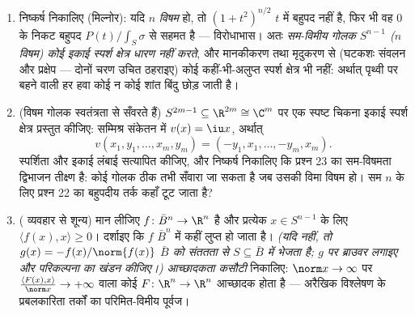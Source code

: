 \begin{problem}[{सप्ताहांत समस्या --- कोई प्रत्याकर्षण नहीं, कोई
पलायन नहीं}]
\begin{enumerate}[resume]
        \[
        P(t) = \pm(1 + t^2)^{n/2}\int_S\sigma,
        \qquad\text{चिह्न } + \text{ के साथ, छोटे } t \text{ के लिए}
        \]
        ( $t = 0$ से  द्वारा सुरक्षित)।
  \item निष्कर्ष निकालिए (मिल्नोर): यदि $n$ \emph{विषम} हो, तो
        $(1 +
        t^2)^{n/2}$ $t$ में बहुपद नहीं है, फिर भी वह $0$ के निकट
        बहुपद $P(t)/\int_S\sigma$ से सहमत है --- विरोधाभास। अतः \emph{सम-विमीय
        गोलक $S^{n-1}$ ($n$ विषम) कोई इकाई स्पर्श क्षेत्र धारण नहीं
        करते}, और मानकीकरण तथा मृदुकरण से (घटकशः संवलन और प्रक्षेप
        --- दोनों चरण उचित ठहराइए) कोई  कहीं-भी-अलुप्त स्पर्श
        क्षेत्र भी नहीं: अर्थात् पृथ्वी पर बहने वाली हर हवा कोई न
        कोई शांत बिंदु छोड़ जाती है।

  \item (विषम गोलक स्वतंत्रता से सँवरते हैं) $S^{2m-1}
        \subseteq \R^{2m} \cong \C^m$ पर एक स्पष्ट
        चिकना इकाई स्पर्श क्षेत्र प्रस्तुत कीजिए: सम्मिश्र संकेतन
        में $v(x) = \iu x$, अर्थात्
        \[
        v(x_1, y_1, \dots, x_m, y_m) =
        (-y_1, x_1, \dots, -y_m, x_m) .
        \]
        स्पर्शिता और इकाई लंबाई सत्यापित कीजिए, और निष्कर्ष
        निकालिए कि प्रश्न 23 का सम-विषमता द्विभाजन तीक्ष्ण है:
        कोई गोलक ठीक तभी सँवारा जा सकता है जब उसकी विमा विषम हो।
        सम $n$ के लिए प्रश्न 22 का बहुपदीय तर्क कहाँ टूट जाता
        है?
  \item ( व्यवहार से शून्य) मान लीजिए $f \colon \bar
        B^n \to \R^n$  है और
        प्रत्येक $x \in S^{n-1}$ के लिए $\langle f(x),
        x\rangle \geq 0$। दर्शाइए कि $f$ $\bar B^n$ में
        कहीं लुप्त हो जाता है। \emph{(यदि नहीं, तो $g(x) = -f(x)/\norm{f(x)}$ $\bar B$ को
        संततता से $S \subseteq \bar B$ में भेजता है; $g$ पर ब्राउवर लगाइए और
         परिकल्पना का खंडन कीजिए।)} \emph{आच्छादकता कसौटी}
        निकालिए: $\norm x \to \infty$ पर $\frac{\langle F(x), x\rangle}{\norm x} \to
        +\infty$ वाला कोई  $F\colon\R^n\to\R^n$ आच्छादक होता
        है --- अरैखिक विश्लेषण के प्रबलकारिता तर्कों का
        परिमित-विमीय पूर्वज।
\end{enumerate}
\end{problem}
